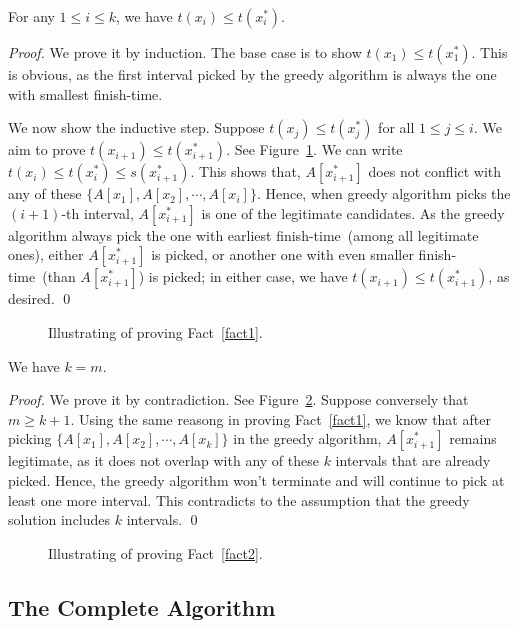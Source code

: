 \begin{fact} \label{fact1}
For any $1 \le i \le k$, we have $t(x_i) \le t(x_i^*)$.
\end{fact}

\emph{Proof.} We prove it by induction. The base case
is to show $t(x_1) \le t(x_1^*)$. This is obvious,
as the first interval picked by the greedy algorithm 
is always the one with smallest finish-time.

We now show the inductive step. Suppose $t(x_j) \le t(x_j^*)$ for all $1\le j \le i$.
We aim to prove $t(x_{i+1}) \le t(x_{i+1}^*)$. See Figure~\ref{fig:inductive}.
We can write $t(x_i) \le t(x_i^*) \le s(x_{i+1}^*)$. 
This shows that, $A[x^*_{i+1}]$ does not conflict with 
any of these $\{A[x_1], A[x_2], \cdots, A[x_i]\}$.
Hence, when greedy algorithm picks the $(i+1)$-th interval, 
$A[x^*_{i+1}]$ is one of the legitimate candidates.
As the greedy algorithm always pick the one with earliest finish-time~(among all legitimate ones), 
either $A[x^*_{i+1}]$ is picked, or another one with even smaller finish-time~(than $A[x^*_{i+1}]$) is picked;
in either case, we have $t(x_{i+1}) \le t(x_{i+1}^*)$, as desired. \qed

\begin{figure}[h]
\centering{}
\caption{Illustrating of proving Fact~\ref{fact1}.}
\label{fig:inductive}
\end{figure}

\begin{fact} \label{fact2}
We have $k = m$.
\end{fact}

\emph{Proof.} We prove it by contradiction.
See Figure~\ref{fig:fact2}.  Suppose conversely that $m \ge k + 1$.
Using the same reasong in proving Fact~\ref{fact1},
we know that after picking $\{A[x_1], A[x_2], \cdots, A[x_k]\}$ in the greedy algorithm,
$A[x^*_{i+1}]$ remains legitimate, as it does not overlap with any of these $k$ intervals that are already picked.
Hence, the greedy algorithm won't terminate and will continue to pick at least one more interval.
This contradicts to the assumption that the greedy solution includes $k$ intervals. \qed

\begin{figure}[h]
\centering{}
\caption{Illustrating of proving Fact~\ref{fact2}.}
\label{fig:fact2}
\end{figure}


\subsection*{The Complete Algorithm}

